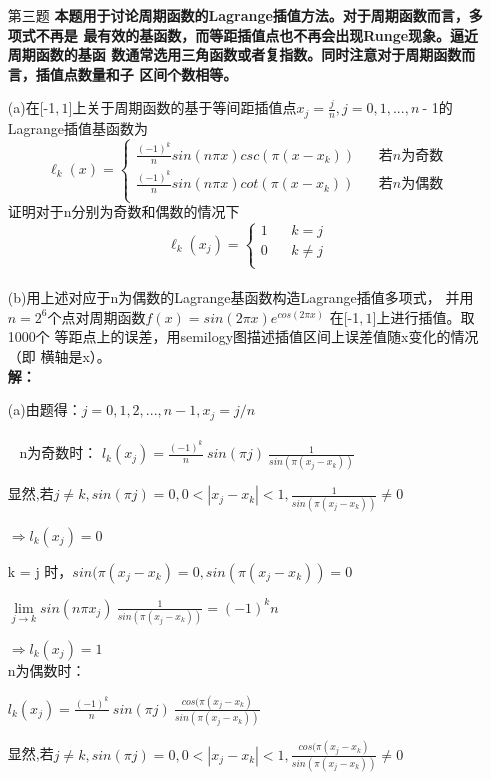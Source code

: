 \documentclass[12pt,a4paper,UTF8]{ctexart}
\begin{document}
\begin{enumerate}
\item[第三题] \textbf{本题用于讨论周期函数的Lagrange插值方法。对于周期函数而言，多项式不再是
最有效的基函数，而等距插值点也不再会出现Runge现象。逼近周期函数的基函
数通常选用三角函数或者复指数。同时注意对于周期函数而言，插值点数量和子
区间个数相等。
}

(a)在$[$\textnormal{-}1$,1]$上关于周期函数的基于等间距插值点$x_j = \frac{j}{n},j = 0,1, ...,
n~$\textnormal{-} 1$ $的Lagrange插值基函数为
$$\ell_k(x) = \begin{cases}
\frac{(-1)^{k}}{n}sin(n\pi x)csc(\pi(x - x_k))~~~~&若n为奇数\\
\frac{(-1)^{k}}{n}sin(n\pi x)cot(\pi(x - x_k))~~~~&若n为偶数\\
\end{cases}$$
证明对于n分别为奇数和偶数的情况下
$$\ell_k(x_j) = \begin{cases}
1~~~~&k = j\\
0~~~~&k \neq j\\
\end{cases}$$\\
(b)用上述对应于n为偶数的Lagrange基函数构造Lagrange插值多项式，
并用$n = 2^{6}$个点对周期函数$f(x) = sin(2\pi x)e^{cos(2\pi x)}$
在$[$\textnormal{-}1$,1]$上进行插值。取1000个
等距点上的误差，用semilogy图描述插值区间上误差值随x变化的情况（即
横轴是x）。
\\ 

\textbf{解：}

(a)由题得：$j = 0,1,2,...,n-1, x_j = j/n$\\
\\~
n为奇数时：
\qquad $l_k(x_j) = \frac{(-1)^k}{n}~sin(\pi j)~\frac{1}{sin(\pi(x_j - x_k))}$

显然,若$j \neq k, sin(\pi j)=0, 0 < |x_j - x_k| < 1, \frac{1}{sin(\pi(x_j - x_k))} \neq 0$

\quad $\Rightarrow l_k(x_j) = 0$

k = j 时，$sin(\pi(x_j - x_k) = 0, sin(\pi(x_j - x_k)) = 0$

\qquad $\lim\limits_{j \to k} sin(n\pi x_j)~\frac{1}{sin(\pi(x_j - x_k))} = (-1)^k n$

\quad $\Rightarrow l_k(x_j) = 1$\\
n为偶数时：

\qquad $l_k(x_j) = \frac{(-1)^k}{n}~sin(\pi j)~\frac{cos(\pi(x_j - x_k)}{sin(\pi(x_j - x_k))}$

显然,若$j \neq k, sin(\pi j)=0, 0 < |x_j - x_k| < 1, \frac{cos(\pi(x_j - x_k)}{sin(\pi(x_j - x_k))} \neq 0$


\end{enumerate}
\end{document}
